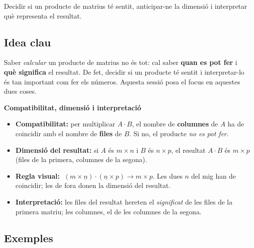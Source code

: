 %
{Decidir si un producte de matrius té sentit, anticipar-ne la dimensió i interpretar què representa el resultat.}

\subsection{Idea clau}

Saber \emph{calcular} un producte de matrius no és tot: cal saber \textbf{quan es
pot fer} i \textbf{què significa} el resultat. De fet, decidir si un producte té
sentit i interpretar-lo és tan important com fer els números. Aquesta sessió posa
el focus en aquestes dues coses.

\begin{idea}
\textbf{Compatibilitat, dimensió i interpretació}
\begin{itemize}[leftmargin=1.4em, itemsep=2pt]
  \item \textbf{Compatibilitat:} per multiplicar $A\cdot B$, el nombre de
        \textbf{columnes} de $A$ ha de coincidir amb el nombre de \textbf{files}
        de $B$. Si no, el producte \emph{no es pot fer}.
  \item \textbf{Dimensió del resultat:} si $A$ és $m\times n$ i $B$ és $n\times p$,
        el resultat $A\cdot B$ és $m\times p$ (files de la primera, columnes de la
        segona).
  \item \textbf{Regla visual:} $\;(m\times \underline{n})\cdot(\underline{n}\times p)
        \rightarrow m\times p$. Les dues $n$ del mig han de coincidir; les de fora
        donen la dimensió del resultat.
  \item \textbf{Interpretació:} les files del resultat hereten el \emph{significat}
        de les files de la primera matriu; les columnes, el de les columnes de la
        segona.
\end{itemize}
\end{idea}

\subsection{Exemples}

